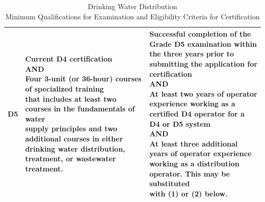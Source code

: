 \documentclass{article}
\begin{document}
\begin{table}[H]
\begin{tabular}{|c|p{7.1cm}|p{7cm}|}
D5    & \makecell[l]{Current D4 certification\\AND\\Four 3-unit (or 36-hour) courses of specialized training\\ that includes at least two courses in the fundamentals of water\\supply principles and two additional courses in either\\ drinking water distribution, treatment, or wastewater treatment.} & \makecell[l]{Successful completion of the Grade D5 examination within\\the three years prior to submitting the application for\\certification\\AND\\At least two years of operator experience working as a\\certified D4 operator for a D4 or D5 system\\AND\\At least three additional years of operator experience\\working as a distribution operator. This may be substituted\\with (1) or (2) below.}\\ \hline
\end{tabular}

\footnotesize{\caption{Drinking Water Distribution\\
Minimum Qualifications for Examination and Eligibility Criteria for Certification}}

\end{table}
\end{document}

